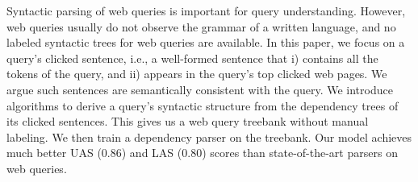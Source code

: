 Syntactic parsing of web queries is important for query understanding. However, web queries usually do not observe the grammar of a written language, and no labeled syntactic trees for web queries are available. In this paper, we focus on a query's clicked sentence, i.e., a well-formed sentence that i) contains all the tokens of the query, and ii) appears in the query's top clicked web pages. We argue such sentences are semantically consistent with the query. We introduce algorithms to derive a query's syntactic structure from the dependency trees of its clicked sentences. This gives us a web query treebank without manual labeling. We then train a dependency parser on the treebank. Our model achieves much better UAS (0.86) and LAS (0.80) scores than state-of-the-art parsers on web queries.
